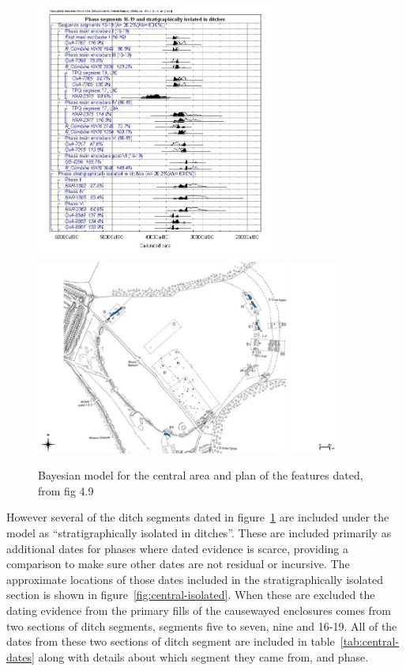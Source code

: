 \begin{figure}
\centering
	\includegraphics[width=0.7\textwidth]{figures/model2}
	\includegraphics[width=0.9\textwidth]{figures/model2-plan}
  \caption{Bayesian model for the central area and plan of the features dated, from fig 4.9 \citep[140]{Whittle:2011kl}}
  \label{fig:central2}
\end{figure}

However several of the ditch segments dated in figure~\ref{fig:central2} are included under the model as ``stratigraphically isolated in ditches''. These are included primarily as additional dates for phases where dated evidence is scarce, providing a comparison to make sure other dates are not residual or incursive. The approximate locations of those dates included in the stratigraphically isolated section is shown in figure~\ref{fig:central-isolated}. When these are excluded the dating evidence from the primary fills of the causewayed enclosures comes from two sections of ditch segments, segments five to seven, nine and 16-19. All of the dates from these two sections of ditch segment are included in table~\ref{tab:central-dates} along with details about which segment they came from, and phase.

